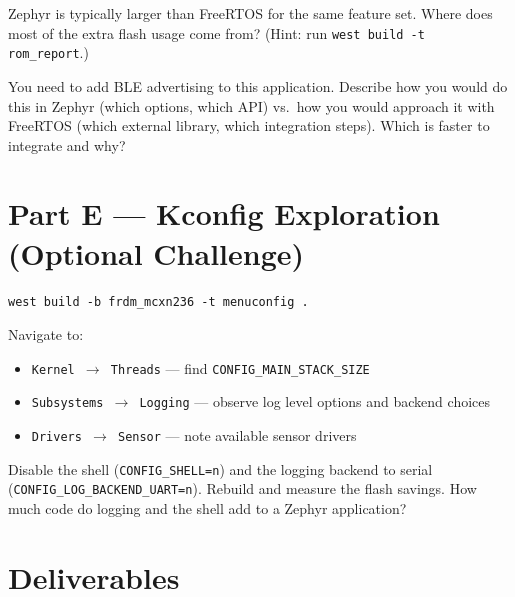 \documentclass[11pt, a4paper]{article}
\begin{document}
\begin{questionbox}[~D1]
  Zephyr is typically larger than FreeRTOS for the same feature set. Where does most
  of the extra flash usage come from? (Hint: run \texttt{west build -t rom\_report}.)
\end{questionbox}

\begin{questionbox}[~D2]
  You need to add BLE advertising to this application. Describe how you would do this
  in Zephyr (which  options, which API) vs.\ how you would approach it
  with FreeRTOS (which external library, which integration steps). Which is faster to
  integrate and why?
\end{questionbox}

\section{Part E --- Kconfig Exploration (Optional Challenge)}

\begin{lstlisting}[style=bashstyle]
west build -b frdm_mcxn236 -t menuconfig .
\end{lstlisting}

Navigate to:
\begin{itemize}[noitemsep, leftmargin=*]
  \item \texttt{Kernel $\to$ Threads} --- find \texttt{CONFIG\_MAIN\_STACK\_SIZE}
  \item \texttt{Subsystems $\to$ Logging} --- observe log level options and backend
        choices
  \item \texttt{Drivers $\to$ Sensor} --- note available sensor drivers
\end{itemize}

\begin{questionbox}[~Challenge]
  Disable the shell (\texttt{CONFIG\_SHELL=n}) and the logging backend to serial
  (\texttt{CONFIG\_LOG\_BACKEND\_UART=n}). Rebuild and measure the flash savings. How
  much code do logging and the shell add to a Zephyr application?
\end{questionbox}

\section{Deliverables}
\end{document}
